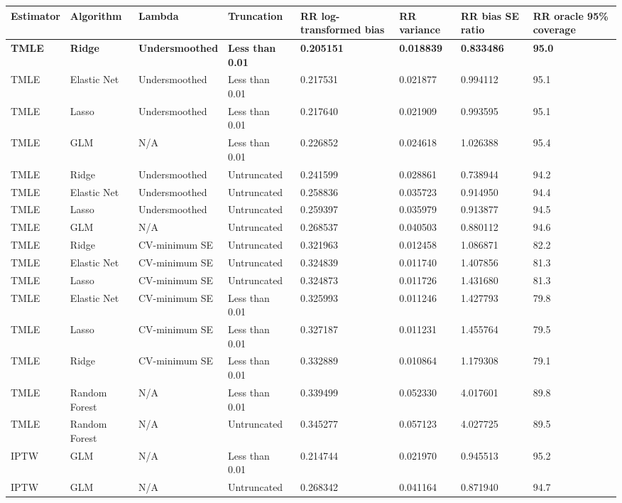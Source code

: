 
\begin{longtable}[l]{llllllll}
\toprule
Estimator & Algorithm & Lambda & Truncation & RR log-transformed bias & RR variance & RR bias SE ratio & RR oracle 95\% coverage\\
\midrule
\midrule
\textbf{TMLE} & \textbf{Ridge} & \textbf{Undersmoothed} & \textbf{Less than 0.01} & \textbf{0.205151} & \textbf{0.018839} & \textbf{0.833486} & \textbf{95.0}\\
\midrule
TMLE & Elastic Net & Undersmoothed & Less than 0.01 & 0.217531 & 0.021877 & 0.994112 & 95.1\\
TMLE & Lasso & Undersmoothed & Less than 0.01 & 0.217640 & 0.021909 & 0.993595 & 95.1\\
TMLE & GLM & N/A & Less than 0.01 & 0.226852 & 0.024618 & 1.026388 & 95.4\\
TMLE & Ridge & Undersmoothed & Untruncated & 0.241599 & 0.028861 & 0.738944 & 94.2\\
TMLE & Elastic Net & Undersmoothed & Untruncated & 0.258836 & 0.035723 & 0.914950 & 94.4\\
TMLE & Lasso & Undersmoothed & Untruncated & 0.259397 & 0.035979 & 0.913877 & 94.5\\
TMLE & GLM & N/A & Untruncated & 0.268537 & 0.040503 & 0.880112 & 94.6\\
TMLE & Ridge & CV-minimum SE & Untruncated & 0.321963 & 0.012458 & 1.086871 & 82.2\\
TMLE & Elastic Net & CV-minimum SE & Untruncated & 0.324839 & 0.011740 & 1.407856 & 81.3\\
TMLE & Lasso & CV-minimum SE & Untruncated & 0.324873 & 0.011726 & 1.431680 & 81.3\\
TMLE & Elastic Net & CV-minimum SE & Less than 0.01 & 0.325993 & 0.011246 & 1.427793 & 79.8\\
TMLE & Lasso & CV-minimum SE & Less than 0.01 & 0.327187 & 0.011231 & 1.455764 & 79.5\\
TMLE & Ridge & CV-minimum SE & Less than 0.01 & 0.332889 & 0.010864 & 1.179308 & 79.1\\
TMLE & Random Forest & N/A & Less than 0.01 & 0.339499 & 0.052330 & 4.017601 & 89.8\\
TMLE & Random Forest & N/A & Untruncated & 0.345277 & 0.057123 & 4.027725 & 89.5\\
IPTW & GLM & N/A & Less than 0.01 & 0.214744 & 0.021970 & 0.945513 & 95.2\\
IPTW & GLM & N/A & Untruncated & 0.268342 & 0.041164 & 0.871940 & 94.7\\

\end{longtable}
